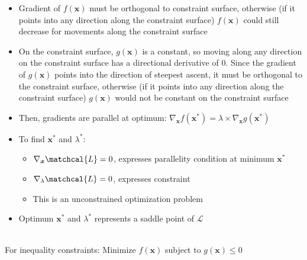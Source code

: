 \begin{itemize}
    \item Gradient of $f(\boldsymbol{x})$ must be orthogonal to constraint surface, otherwise (if it points into any direction along the constraint surface) $f(\boldsymbol{x})$ could still decrease for movements along the constraint surface
    \item On the constraint surface, $g(\boldsymbol{x})$ is a constant, so moving along any direction on the constraint surface has a directional derivative of 0. Since the gradient of $g(\boldsymbol{x})$ points into the direction of steepest ascent, it must be orthogonal to the constraint surface, otherwise (if it points into any direction along the constraint surface) $g(\boldsymbol{x})$ would not be constant on the constraint surface
    \item Then, gradients are parallel at optimum: $\nabla_{\boldsymbol{x}} f(\boldsymbol{x^*}) = \lambda \times \nabla_{\boldsymbol{x}} g(\boldsymbol{x^*})$
    \item To find $\boldsymbol{x^*}$ and $\lambda^*$: 
    \begin{itemize}
        \item $\nabla_{\boldsymbol{x}} \matchcal{L} = 0$, expresses parallelity condition at minimum $\boldsymbol{x^*}$
        \item $\nabla_{\lambda} \matchcal{L} = 0$, expresses constraint
        \item This is an unconstrained optimization problem
    \end{itemize}
    \item Optimum $\boldsymbol{x^*}$ and $\lambda^*$ represents a saddle point of $\mathcal{L}$
\end{itemize}\\
For inequality constraints: Minimize $f(\boldsymbol{x})$ subject to $g(\boldsymbol{x}) \leq 0$ 
